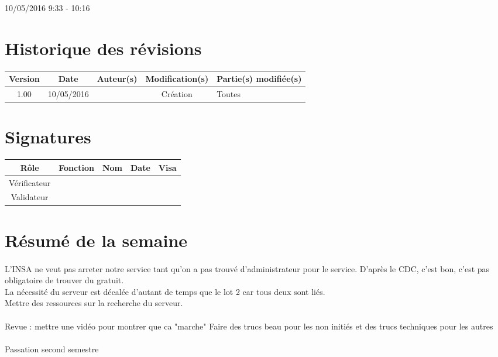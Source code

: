 \documentclass [a4paper] {article}
\begin{document}
\rhead{}

10/05/2016
\hfill   
\hfill 	9:33 - 10:16 				%



\section*{Historique des révisions}
\begin{center}
			\begin{tabular}{| c | c | c | c | p{4cm} |}
				\hline
				\rowcolor{Gray}
				Version & Date & Auteur(s) & Modification(s) & Partie(s) modifiée(s)		 \\
				\hline
				1.00 & 10/05/2016 & \Pierre & Création & Toutes \\
		\hline		
			\end{tabular}
		\end{center}

\section*{Signatures}

		\begin{center}
			\begin{tabular}{| c | c | c | c | p{4cm} |}
				\hline
				\rowcolor{Gray}
				Rôle & Fonction & Nom & Date & Visa		 \\
				\hline
				Vérificateur & \RQA & \Kafui & &  \\[30pt]
				\hline
				Validateur & \CP & \Sergi &  &  \\[30pt]	
				\hline
			\end{tabular}
		\end{center}


\section{Résumé de la semaine}
\paragraph*{}
L'INSA ne veut pas arreter notre service tant qu'on a pas trouvé d'administrateur pour le service. D'après le CDC, c'est bon, c'est pas obligatoire de trouver du gratuit. \\
La nécessité du serveur est décalée d'autant de temps que le lot 2 car tous deux sont liés. \\
Mettre des ressources sur la recherche du serveur.

\paragraph*{}
Revue : mettre une vidéo pour montrer que ca "marche" 
Faire des trucs beau pour les non initiés et des trucs techniques pour les autres

\paragraph*{}
Passation second semestre
\end{document}
